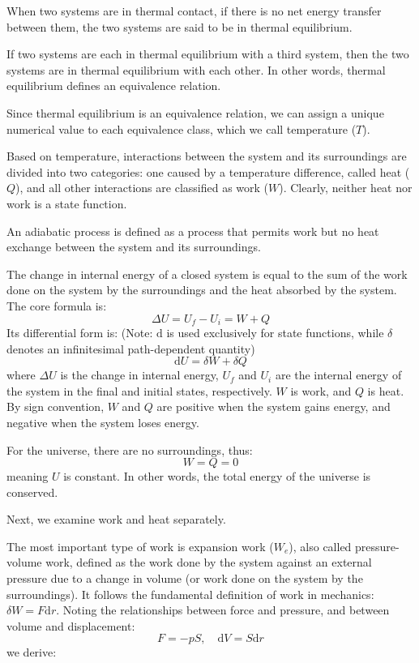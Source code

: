 When two systems are in thermal contact, if there is no net energy transfer between them, the two systems are said to be in thermal equilibrium.

\begin{proposition}
If two systems are each in thermal equilibrium with a third system, then the two systems are in thermal equilibrium with each other. In other words, thermal equilibrium defines an equivalence relation.
\end{proposition}

Since thermal equilibrium is an equivalence relation, we can assign a unique numerical value to each equivalence class, which we call temperature ($T$).

Based on temperature, interactions between the system and its surroundings are divided into two categories: one caused by a temperature difference, called heat ($Q$), and all other interactions are classified as work ($W$). Clearly, neither heat nor work is a state function.

An adiabatic process is defined as a process that permits work but no heat exchange between the system and its surroundings.

\begin{proposition}
The change in internal energy of a closed system is equal to the sum of the work done on the system by the surroundings and the heat absorbed by the system. The core formula is:
$$\Delta U = U_f - U_i = W + Q$$
Its differential form is: (Note: $\mathrm{d}$ is used exclusively for state functions, while $\delta$ denotes an infinitesimal path-dependent quantity)
$$\mathrm{d}U = \delta W + \delta Q$$
where $\Delta U$ is the change in internal energy, $U_f$ and $U_i$ are the internal energy of the system in the final and initial states, respectively. $W$ is work, and $Q$ is heat. By sign convention, $W$ and $Q$ are positive when the system gains energy, and negative when the system loses energy.
\end{proposition}

For the universe, there are no surroundings, thus:
$$W=Q=0$$
meaning $U$ is constant. In other words, the total energy of the universe is conserved.

Next, we examine work and heat separately.

The most important type of work is expansion work ($W_e$), also called pressure-volume work, defined as the work done by the system against an external pressure due to a change in volume (or work done on the system by the surroundings). It follows the fundamental definition of work in mechanics: $\delta W=F \mathrm{d}r$. Noting the relationships between force and pressure, and between volume and displacement:
$$F = - p S, \quad \mathrm{d}V = S \mathrm{d}r$$
we derive:

